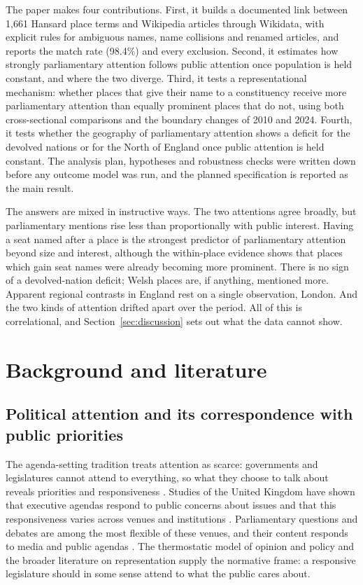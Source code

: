 \documentclass[11pt,a4paper]{article}
\begin{document}
The paper makes four contributions. First, it builds a documented link between 1,661 Hansard place terms and Wikipedia articles through Wikidata, with explicit rules for ambiguous names, name collisions and renamed articles, and reports the match rate (98.4\%) and every exclusion. Second, it estimates how strongly parliamentary attention follows public attention once population is held constant, and where the two diverge. Third, it tests a representational mechanism: whether places that give their name to a constituency receive more parliamentary attention than equally prominent places that do not, using both cross-sectional comparisons and the boundary changes of 2010 and 2024. Fourth, it tests whether the geography of parliamentary attention shows a deficit for the devolved nations or for the North of England once public attention is held constant. The analysis plan, hypotheses and robustness checks were written down before any outcome model was run, and the planned specification is reported as the main result.

The answers are mixed in instructive ways. The two attentions agree broadly, but parliamentary mentions rise less than proportionally with public interest. Having a seat named after a place is the strongest predictor of parliamentary attention beyond size and interest, although the within-place evidence shows that places which gain seat names were already becoming more prominent. There is no sign of a devolved-nation deficit; Welsh places are, if anything, mentioned more. Apparent regional contrasts in England rest on a single observation, London. And the two kinds of attention drifted apart over the period. All of this is correlational, and Section~\ref{sec:discussion} sets out what the data cannot show.

\section{Background and literature}
\subsection{Political attention and its correspondence with public priorities}
The agenda-setting tradition treats attention as scarce: governments and legislatures cannot attend to everything, so what they choose to talk about reveals priorities and responsiveness \citep{BaumgartnerJones1993,JonesBaumgartner2005}. Studies of the United Kingdom have shown that executive agendas respond to public concerns about issues \citep{JenningsJohn2009} and that this responsiveness varies across venues and institutions \citep{BevanJennings2014}. Parliamentary questions and debates are among the most flexible of these venues, and their content responds to media and public agendas \citep{VliegenthartWalgrave2011}. The thermostatic model of opinion and policy \citep{SorokaWlezien2010} and the broader literature on representation \citep{Pitkin1967,EulauKarps1977,Mansbridge2003} supply the normative frame: a responsive legislature should in some sense attend to what the public cares about.
\end{document}
